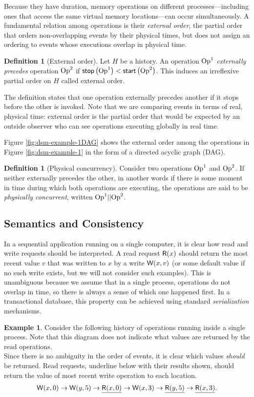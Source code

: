 \documentclass[]             %
{NASA}                       %
\theoremstyle{definition}
\newtheorem{example}[theorem]{Example}
\newtheorem{definition}[theorem]{Definition}
\begin{document}
Because they have duration, memory operations on different
processes---including ones that access the same virtual memory
locations---can occur simultaneously. A fundamental relation among
operations is their \emph{external order}, the partial order that
orders non-overlapping events by their physical times, but does not
assign an ordering to events whose executions overlap in physical
time.
\begin{definition}[External order]
  Let $H$ be a history. An operation $\mathrm{Op}^1$ \emph{externally
    precedes} operation $\mathrm{Op}^2$ if
  $\mathsf{stop}\left(\mathrm{Op}^1\right) < \mathsf{start}\left(\mathrm{Op}^2\right)$. This induces an irreflexive
  partial order on $H$ called external order.
\end{definition}
The definition states that one operation externally precedes another
if it stops before the other is invoked. Note that we are comparing
events in terms of real, physical time: external order is the partial
order that would be expected by an outside observer who can see
operations executing globally in real time.

Figure \ref{fig:dsm-example-1DAG} shows the external order among the
operations in Figure \ref{fig:dsm-example-1} in the form of a directed
acyclic graph (DAG).


\begin{definition}[Physical concurrency]
  Consider two operations $\mathrm{Op}^1$ and $\mathrm{Op}^2$. If neither externally
  precedes the other, in another words if there is some moment in time
  during which both operations are executing, the operations are said
  to be \emph{physically concurrent}, written $\mathrm{Op}^1 || \mathrm{Op}^2$.
\end{definition}

\subsection{Semantics and Consistency}
In a sequential application running on a single computer, it is clear
how read and write requests should be interpreted. A read request
$\mathsf{R}\!\left(x\right)$ should return the most recent value $v$ that was written
to $x$ by a write $\mathsf{W}\!\left(x, v\right)$ (or some default value if no such
write exists, but we will not consider such examples). This is
unambiguous because we assume that in a single process, operations do
not overlap in time, so there is always a sense of which one happened
first. In a transactional database, this property can be achieved
using standard \emph{serialization} mechanisms.

\begin{example}
  Consider the following history of operations running inside a single process.
  Note that this diagram does not indicate what values are returned by the read operations.
  \[\]
  Since there is no ambiguity in the order of events, it is clear
  which values \emph{should} be returned. Read requests, underline
  below with their results shown, should return the value of most
  recent write operation to each location.
  \[ \mathsf{W}\!\left(x, 0\right) \to \mathsf{W}\!\left(y, 5\right) \to \underline{\mathsf{R}\!\left(x, 0\right)} \to \mathsf{W}\!\left(x, 3\right) \to \underline{\mathsf{R}\!\left(y, 5\right)} \to \underline{\mathsf{R}\!\left(x, 3\right)}. \]
\end{example}
\end{document}
